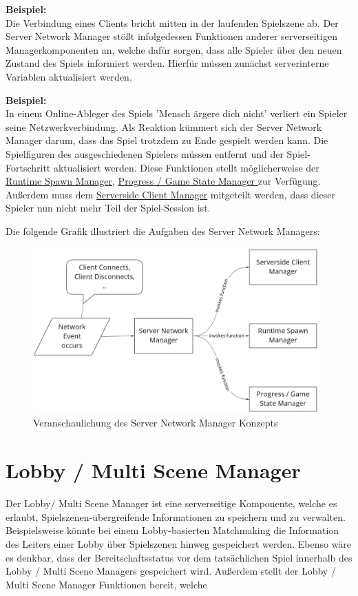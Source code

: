 \textbf{Beispiel:} \\
Die Verbindung eines Clients bricht mitten in der laufenden Spielszene ab. Der Server Network Manager stößt infolgedessen Funktionen anderer serverseitigen Managerkomponenten an, welche dafür sorgen, dass alle Spieler über den neuen Zustand des Spiels informiert werden. Hierfür müssen zunächst serverinterne Variablen aktualisiert werden.

\textbf{Beispiel:}  \\
In einem Online-Ableger des Spiels 'Mensch ärgere dich nicht' verliert ein Spieler seine Netzwerkverbindung. Als Reaktion kümmert sich der Server Network Manager darum, dass das Spiel trotzdem zu Ende gespielt werden kann. Die Spielfiguren des ausgeschiedenen Spielers müssen entfernt und der Spiel-Fortschritt aktualisiert werden. Diese Funktionen stellt möglicherweise der \hyperref[spawn_manager]{Runtime Spawn Manager}, \hyperref[progress_manager]{Progress / Game State Manager } zur Verfügung.
Außerdem muss dem \hyperref[serverside_client_manager]{Serverside Client Manager} mitgeteilt werden, dass dieser Spieler nun nicht mehr Teil der Spiel-Session ist.

Die folgende Grafik illustriert die Aufgaben des Server Network Managers:

\begin{figure}[H]
	\centering
	\includegraphics[width=110mm]{images/Server_Network_Manager.jpg}
	\caption[Server Network Manager Diagramm]{Veranschaulichung des Server Network Manager Konzepts}
	\label{pic:Server_Network_Manager}
\end{figure}

\section{Lobby / Multi Scene Manager}

Der Lobby/ Multi Scene Manager ist eine serverseitige Komponente, welche es erlaubt, Spielszenen-übergreifende Informationen zu speichern und zu verwalten. Beispielsweise könnte bei einem Lobby-basierten Matchmaking die Information des Leiters einer Lobby über Spielszenen hinweg gespeichert werden. Ebenso wäre es denkbar, dass der Bereitschaftsstatus vor dem tatsächlichen Spiel innerhalb des Lobby / Multi Scene Managers gespeichert wird. Außerdem stellt der Lobby / Multi Scene Manager Funktionen bereit, welche

